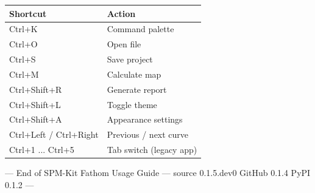 \documentclass[a4paper,11pt]{article}
\begin{document}
\begin{tabularx}{\linewidth}{@{}>{\ttfamily}l X@{}}
\toprule
Shortcut & Action \\
\midrule
Ctrl+K & Command palette \\
Ctrl+O & Open file \\
Ctrl+S & Save project \\
Ctrl+M & Calculate map \\
Ctrl+Shift+R & Generate report \\
Ctrl+Shift+L & Toggle theme \\
Ctrl+Shift+A & Appearance settings \\
Ctrl+Left / Ctrl+Right & Previous / next curve \\
Ctrl+1 ... Ctrl+5 & Tab switch (legacy app) \\
\bottomrule
\end{tabularx}

\vfill

\begin{center}
{\small --- End of SPM-Kit {\textperiodcentered} Fathom Usage Guide --- source 0.1.5.dev0 {\textperiodcentered} GitHub 0.1.4 {\textperiodcentered} PyPI 0.1.2 ---}
\end{center}
\end{document}
